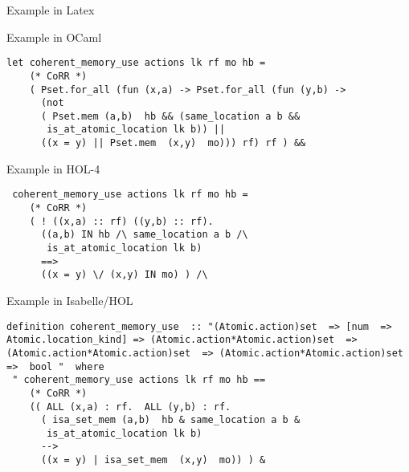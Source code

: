 \documentclass[pdf,nototal]{prosper}
\begin{document}
\begin{slide}{Example in Latex}

{\small
{}
}
\end{slide}


\begin{slide}{Example in OCaml}
{\footnotesize
\begin{verbatim}
let coherent_memory_use actions lk rf mo hb =
    (* CoRR *)
    ( Pset.for_all (fun (x,a) -> Pset.for_all (fun (y,b) -> 
      (not 
      ( Pset.mem (a,b)  hb && (same_location a b && 
       is_at_atomic_location lk b)) || 
      ((x = y) || Pset.mem  (x,y)  mo))) rf) rf ) &&
\end{verbatim}}
\end{slide}

\begin{slide}{Example in HOL-4}
{\small
\begin{verbatim}
 coherent_memory_use actions lk rf mo hb =
    (* CoRR *)
    ( ! ((x,a) :: rf) ((y,b) :: rf).
      ((a,b) IN hb /\ same_location a b /\ 
       is_at_atomic_location lk b) 
      ==>
      ((x = y) \/ (x,y) IN mo) ) /\
\end{verbatim}}
\end{slide}

\begin{slide}{Example in Isabelle/HOL}
{\small
\begin{verbatim}
definition coherent_memory_use  :: "(Atomic.action)set  => [num  =>  Atomic.location_kind] => (Atomic.action*Atomic.action)set  => (Atomic.action*Atomic.action)set  => (Atomic.action*Atomic.action)set  =>  bool "  where 
 " coherent_memory_use actions lk rf mo hb == 
    (* CoRR *)
    (( ALL (x,a) : rf.  ALL (y,b) : rf. 
      ( isa_set_mem (a,b)  hb & same_location a b & 
       is_at_atomic_location lk b) 
      -->
      ((x = y) | isa_set_mem  (x,y)  mo)) ) &
\end{verbatim}}
\end{slide}
\end{document}
